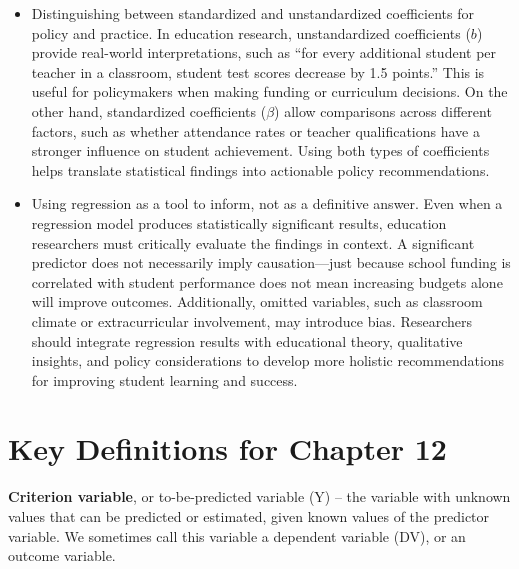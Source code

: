 \documentclass[
  letterpaper,
  DIV=11,
  numbers=noendperiod]{scrreprt}
\begin{document}
\begin{itemize}
  overfitting. For example, if a researcher includes every possible
  student characteristic in a model predicting standardized test scores,
  the model may explain a large proportion of variance but may not
  generalize to other student populations. The adjusted \(R^2\) accounts
  for the number of predictors and sample size, helping researchers
  avoid inflated model performance and ensure real-world applicability.
\item
  Distinguishing between standardized and unstandardized coefficients
  for policy and practice. In education research, unstandardized
  coefficients (\(b\)) provide real-world interpretations, such as ``for
  every additional student per teacher in a classroom, student test
  scores decrease by 1.5 points.'' This is useful for policymakers when
  making funding or curriculum decisions. On the other hand,
  standardized coefficients (\(\beta\)) allow comparisons across
  different factors, such as whether attendance rates or teacher
  qualifications have a stronger influence on student achievement. Using
  both types of coefficients helps translate statistical findings into
  actionable policy recommendations.
\item
  Using regression as a tool to inform, not as a definitive answer. Even
  when a regression model produces statistically significant results,
  education researchers must critically evaluate the findings in
  context. A significant predictor does not necessarily imply
  causation---just because school funding is correlated with student
  performance does not mean increasing budgets alone will improve
  outcomes. Additionally, omitted variables, such as classroom climate
  or extracurricular involvement, may introduce bias. Researchers should
  integrate regression results with educational theory, qualitative
  insights, and policy considerations to develop more holistic
  recommendations for improving student learning and success.
\end{itemize}

\section*{Key Definitions for Chapter
12}\label{key-definitions-for-chapter-12}


\textbf{Criterion variable}, or to-be-predicted variable (Y) -- the
variable with unknown values that can be predicted or estimated, given
known values of the predictor variable. We sometimes call this variable
a dependent variable (DV), or an outcome variable.\,\,
\end{document}
